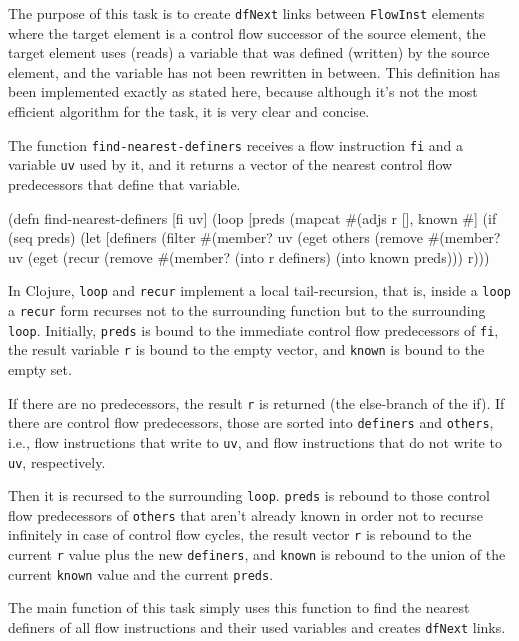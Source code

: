 \documentclass[submission]{eptcs}
\begin{document}
The purpose of this task is to create \verb|dfNext| links between
\verb|FlowInst| elements where the target element is a control flow successor
of the source element, the target element uses (reads) a variable that was
defined (written) by the source element, and the variable has not been
rewritten in between.  This definition has been implemented exactly as stated
here, because although it's not the most efficient algorithm for the task, it
is very clear and concise.

The function \verb|find-nearest-definers| receives a flow instruction \verb|fi|
and a variable \verb|uv| used by it, and it returns a vector of the nearest
control flow predecessors that define that variable.

\begin{clojurecode}
(defn find-nearest-definers [fi uv]
  (loop [preds (mapcat #(adjs %
         r [], known #{}]
    (if (seq preds)
      (let [definers (filter #(member? uv (eget %
            others   (remove #(member? uv (eget %
        (recur (remove #(member? %
               (into r definers) (into known preds)))
      r)))
\end{clojurecode}

In Clojure, \verb|loop| and \verb|recur| implement a local tail-recursion, that
is, inside a \verb|loop| a \verb|recur| form recurses not to the surrounding
function but to the surrounding \verb|loop|.  Initially, \verb|preds| is bound
to the immediate control flow predecessors of \verb|fi|, the result variable
\verb|r| is bound to the empty vector, and \verb|known| is bound to the empty
set.

If there are no predecessors, the result \verb|r| is returned (the else-branch
of the if).  If there are control flow predecessors, those are sorted into
\verb|definers| and \verb|others|, i.e., flow instructions that write to
\verb|uv|, and flow instructions that do not write to \verb|uv|, respectively.

Then it is recursed to the surrounding \verb|loop|.  \verb|preds| is rebound to
those control flow predecessors of \verb|others| that aren't already known in
order not to recurse infinitely in case of control flow cycles, the result
vector \verb|r| is rebound to the current \verb|r| value plus the new
\verb|definers|, and \verb|known| is rebound to the union of the current
\verb|known| value and the current \verb|preds|.

The main function of this task simply uses this function to find the nearest
definers of all flow instructions and their used variables and creates
\verb|dfNext| links.
\end{document}

